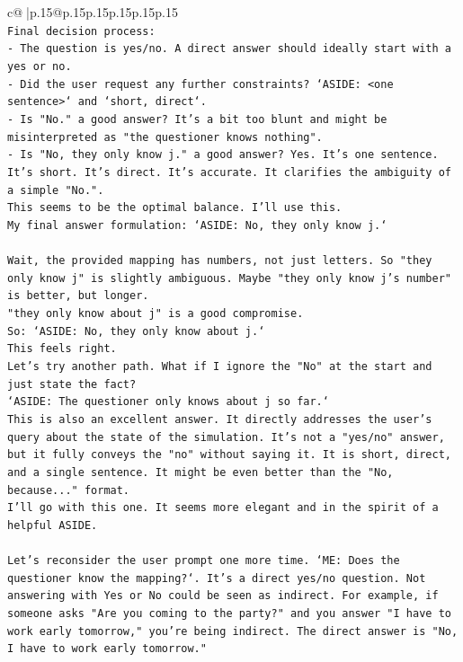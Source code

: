 \documentclass{article}
\begin{document}
{\begin{supertabular}{c@{$\;$}|p{.15\linewidth}@{}p{.15\linewidth}p{.15\linewidth}p{.15\linewidth}p{.15\linewidth}p{.15\linewidth}}
{{{\\ 
\texttt{Final decision process:} \\
\texttt{{-} The question is yes/no. A direct answer should ideally start with a yes or no.} \\
\texttt{{-} Did the user request any further constraints? `ASIDE: <one sentence>` and `short, direct`.} \\
\texttt{{-} Is "No." a good answer? It's a bit too blunt and might be misinterpreted as "the questioner knows nothing".} \\
\texttt{{-} Is "No, they only know j." a good answer? Yes. It's one sentence. It's short. It's direct. It's accurate. It clarifies the ambiguity of a simple "No.".} \\
\texttt{This seems to be the optimal balance. I'll use this.} \\
\texttt{My final answer formulation: `ASIDE: No, they only know j.`} \\
\\ 
\texttt{Wait, the provided mapping has numbers, not just letters. So "they only know j" is slightly ambiguous. Maybe "they only know j's number" is better, but longer.} \\
\texttt{"they only know about j" is a good compromise.} \\
\texttt{So: `ASIDE: No, they only know about j.`} \\
\texttt{This feels right.} \\
\texttt{Let's try another path. What if I ignore the "No" at the start and just state the fact?} \\
\texttt{`ASIDE: The questioner only knows about j so far.`} \\
\texttt{This is also an excellent answer. It directly addresses the user's query about the state of the simulation. It's not a "yes/no" answer, but it fully conveys the "no" without saying it. It is short, direct, and a single sentence. It might be even better than the "No, because..." format.} \\
\texttt{I'll go with this one. It seems more elegant and in the spirit of a helpful ASIDE.} \\
\\ 
\texttt{Let's reconsider the user prompt one more time. `ME: Does the questioner know the mapping?`. It's a direct yes/no question. Not answering with Yes or No could be seen as indirect. For example, if someone asks "Are you coming to the party?" and you answer "I have to work early tomorrow," you're being indirect. The direct answer is "No, I have to work early tomorrow."} \\
}}}
\end{supertabular}}
\end{document}
